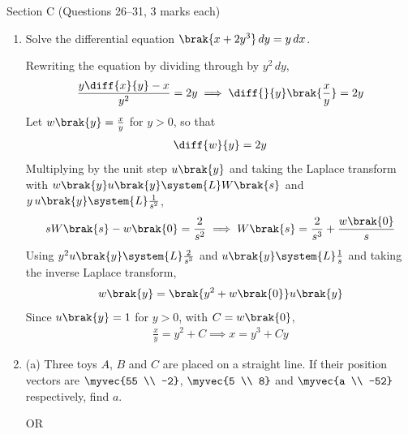 \vspace{2mm}
\noindent Section C (Questions 26--31, 3 marks each)
\begin{enumerate}[label=\thesubsection.\arabic*, ref=\thesubsection.\theenumi, start=26]





\item Solve the differential equation $\brak{x + 2y^3}\,dy = y\,dx$.
\par\solution
Rewriting the equation by dividing through by $y^2\,dy$,
\begin{align}
	\frac{y\diff{x}{y} - x}{y^2} = 2y \implies \diff{}{y}\brak{\frac{x}{y}} = 2y
\end{align}
Let $w\brak{y} = \frac{x}{y}$ for $y > 0$, so that
\begin{align}
	\diff{w}{y} = 2y
\end{align}
Multiplying by the unit step $u\brak{y}$ and taking the Laplace transform with $w\brak{y}u\brak{y} \system{L} W\brak{s}$ and $y\,u\brak{y} \system{L} \frac{1}{s^2}$,
\begin{align}
	sW\brak{s} - w\brak{0} = \frac{2}{s^2}
	\implies W\brak{s} = \frac{2}{s^3} + \frac{w\brak{0}}{s}
\end{align}
Using $y^2u\brak{y} \system{L} \frac{2}{s^3}$ and $u\brak{y} \system{L} \frac{1}{s}$ and taking the inverse Laplace transform,
\begin{align}
	w\brak{y} = \brak{y^2 + w\brak{0}}u\brak{y}
\end{align}
Since $u\brak{y} = 1$ for $y > 0$, with $C = w\brak{0}$,
\begin{align}
	\frac{x}{y} = y^2 + C \implies x = y^3 + Cy
\end{align}
















\item 
(a) Three toys $A$, $B$ and $C$ are placed on a straight line. If their position vectors are $\myvec{55 \\ -2}$, $\myvec{5 \\ 8}$ and $\myvec{a \\ -52}$ respectively, find $a$.

OR


\end{enumerate}
